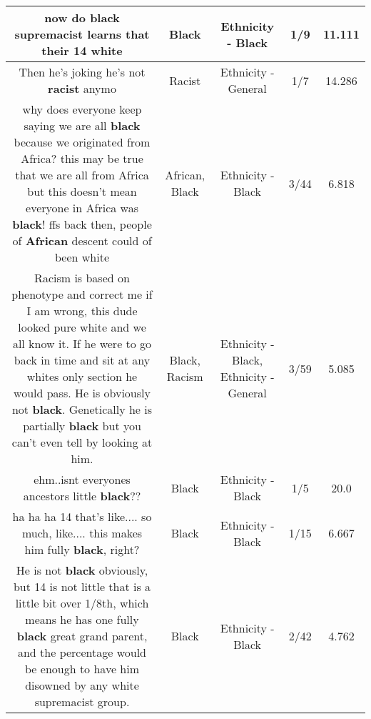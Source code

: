 \documentclass[11pt]{article}
\newlength\mylength
\begin{document}
\begin{center}
\begin{longtable}{|C{.65\mylength}|C{.30\mylength}|C{.12\mylength}|C{.12\mylength}|C{.12\mylength}|}
  \small now do \textbf{black} supremacist learns that their 14 white\normalsize   & Black & Ethnicity - Black & 1/9 & 11.111 \\  \hline
  \small Then he's joking he's not \textbf{racist} anymo\normalsize   & Racist & Ethnicity - General & 1/7 & 14.286 \\  \hline
  \small why does everyone keep saying we are all \textbf{black} because we originated from Africa? this may be true that we are all from Africa but this doesn't mean everyone in Africa was \textbf{black}! ffs back then, people of \textbf{African} descent could of been white\normalsize   & African, Black & Ethnicity - Black & 3/44 & 6.818 \\  \hline
  \small Racism is based on phenotype and correct me if I am wrong, this dude looked pure white and we all know it.  If he were to go back in time and sit at any whites only section he would pass.  He is obviously not \textbf{black}.  Genetically he is partially \textbf{black} but you can't even tell by looking at him.\normalsize   & Black, Racism & Ethnicity - Black, Ethnicity - General & 3/59 & 5.085 \\  \hline
  \small ehm..isnt everyones ancestors little \textbf{black}??\normalsize   & Black & Ethnicity - Black & 1/5 & 20.0 \\  \hline
  \small ha ha ha 14 that's like.... so much, like.... this makes him fully \textbf{black}, right?\normalsize   & Black & Ethnicity - Black & 1/15 & 6.667 \\  \hline
  \small He is not \textbf{black} obviously, but 14 is not little that is a little bit over 1/8th, which means he has one fully \textbf{black} great grand parent, and the percentage would be enough to have him disowned by any white supremacist group.\normalsize   & Black & Ethnicity - Black & 2/42 & 4.762 \\  \hline

\end{longtable}
\end{center}
\end{document}
